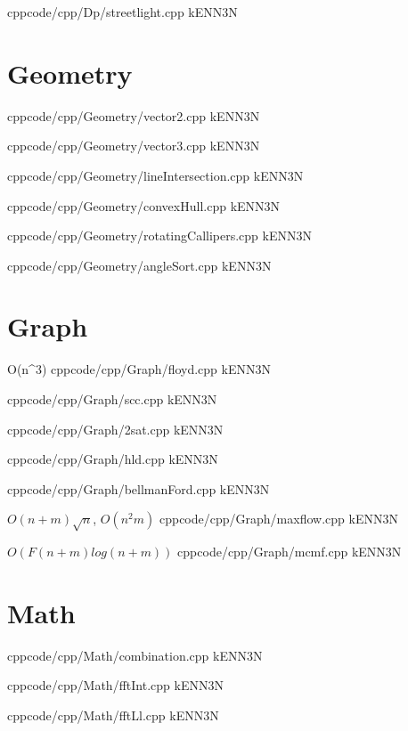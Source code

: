 \documentclass[landscape, 8pt, a4paper, twocolumn]{extarticle} %
\begin{document}
{}{}
{cpp}{code/cpp/Dp/streetlight.cpp}
{kENN3N}

\pagebreak
\section{Geometry}

{}{}
{cpp}{code/cpp/Geometry/vector2.cpp}
{kENN3N}

{}{}
{cpp}{code/cpp/Geometry/vector3.cpp}
{kENN3N}

{}{}
{cpp}{code/cpp/Geometry/lineIntersection.cpp}
{kENN3N}

{}{}
{cpp}{code/cpp/Geometry/convexHull.cpp}
{kENN3N}

{}{}
{cpp}{code/cpp/Geometry/rotatingCallipers.cpp}
{kENN3N}

{}{}
{cpp}{code/cpp/Geometry/angleSort.cpp}
{kENN3N}

\pagebreak
\section{Graph}

{}{O(n^3)}
{cpp}{code/cpp/Graph/floyd.cpp}
{kENN3N}

{}{}
{cpp}{code/cpp/Graph/scc.cpp}
{kENN3N}

{}{}
{cpp}{code/cpp/Graph/2sat.cpp}
{kENN3N}

{}{}
{cpp}{code/cpp/Graph/hld.cpp}
{kENN3N}

{}{}
{cpp}{code/cpp/Graph/bellmanFord.cpp}
{kENN3N}

{}{$O(n+m)\sqrt n$, $O(n^2m)$}
{cpp}{code/cpp/Graph/maxflow.cpp}
{kENN3N}

{}{$O(F(n+m)log(n+m))$}
{cpp}{code/cpp/Graph/mcmf.cpp}
{kENN3N}

\pagebreak
\section{Math}

{}{}
{cpp}{code/cpp/Math/combination.cpp}
{kENN3N}

{}{}
{cpp}{code/cpp/Math/fftInt.cpp}
{kENN3N}

{}{}
{cpp}{code/cpp/Math/fftLl.cpp}
{kENN3N}
\end{document}
